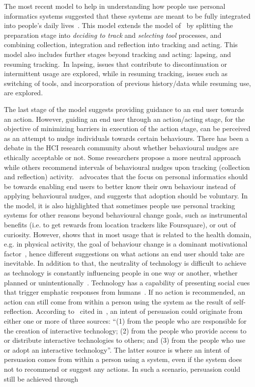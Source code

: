 The most recent model to help in understanding how people use personal informatics systems suggested that these systems are meant to be fully integrated into people's daily lives~\citep{epstein2015lived}. This model extends the model of~\cite{li2010stage} by splitting the preparation stage into \emph{deciding to track} and \emph{selecting tool} processes, and combining collection, integration and reflection into tracking and acting. This model also includes further stages beyond tracking and acting: lapsing, and resuming tracking.~In lapsing, issues that contribute to discontinuation or intermittent usage are explored, while in resuming tracking, issues such as switching of tools, and incorporation of previous history/data while resuming use, are explored.  

The last stage of the \cite{li2010stage} model suggests providing guidance to an end user towards an action. However, guiding an end user through an action/acting stage, for the objective of minimizing barriers in execution of the action stage, can be perceived as an attempt to nudge individuals towards certain behaviours. There has been a debate in the HCI research community about whether behavioural nudges are ethically acceptable or not. Some researchers propose a more neutral approach while others recommend intervals of behavioural nudges upon tracking (collection and reflection) activity.~\cite{munson2012mindfulness} advocates that the focus on personal informatics  should be towards enabling end users to better know their own behaviour instead of applying behavioural nudges, and suggests that adoption should be voluntary. In the \cite{epstein2015lived} model, it is also highlighted that sometimes people use personal tracking systems for other reasons beyond behavioural change goals, such as instrumental benefits (i.e. to get rewards from location trackers like Foursquare), or out of curiosity. However, \cite{epstein2015lived} shows that in most usage that is related to the health domain, e.g. in physical activity, the goal of behaviour change is a dominant motivational factor~\citep{epstein2015lived}, hence different suggestions on what actions an end user should take are inevitable. In addition to that, the neutrality of technology is difficult to achieve as technology is constantly influencing people in one way or another, whether planned or unintentionally~\citep{Oinas-kukkonen:psd}. Technology has a capability of presenting social cues that trigger emphatic responses from humans~\citep{foggpersuasivebook}. If no action is recommended, an action can still come from within a person using the system as the result of self-reflection. According to~\cite{fogg1998persuasive} cited in~\cite{Oinas-kukkonen:psd}, an intent of persuasion could originate from either one or more  of three sources: ``(1) from the people who are responsible for the creation of interactive technology; (2) from the people who provide access to or distribute interactive technologies to others; and (3) from the people who use or adopt an interactive technology''. The  latter source  is where an intent of persuasion comes from within a person using a system, even if the system does not to recommend or suggest any actions. In such a scenario, persuasion could still be achieved through 